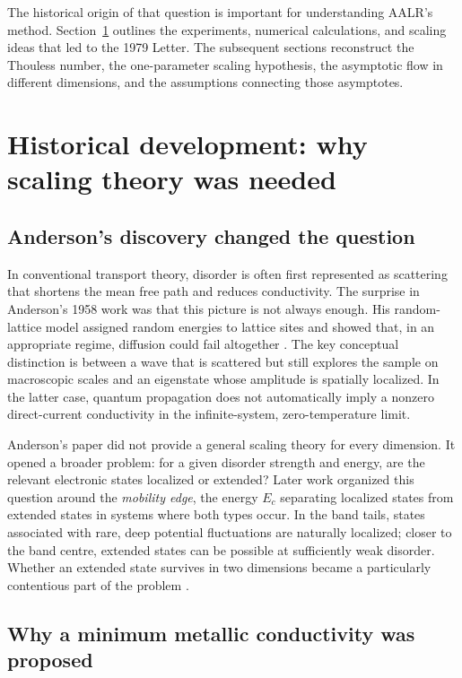 \documentclass[11pt,a4paper]{article}
\numberwithin{equation}{section}
\begin{document}
The historical origin of that question is important for understanding
AALR's method. Section~\ref{sec:historical-background} outlines the
experiments, numerical calculations, and scaling ideas that led to the
1979 Letter. The subsequent sections reconstruct the Thouless number,
the one-parameter scaling hypothesis, the asymptotic flow in different
dimensions, and the assumptions connecting those asymptotes.

\section{Historical development: why scaling theory was needed}
\label{sec:historical-background}

\subsection{Anderson's discovery changed the question}

In conventional transport theory, disorder is often first represented as
scattering that shortens the mean free path and reduces conductivity. The
surprise in Anderson's 1958 work was that this picture is not always enough.
His random-lattice model assigned random energies to lattice sites and
showed that, in an appropriate regime, diffusion could fail altogether
\cite{Anderson1958}. The key conceptual distinction is between a wave that
is scattered but still explores the sample on macroscopic scales and an
eigenstate whose amplitude is spatially localized. In the latter case,
quantum propagation does not automatically imply a nonzero direct-current
conductivity in the infinite-system, zero-temperature limit.

Anderson's paper did not provide a general scaling theory for every
dimension. It opened a broader problem: for a given disorder strength and
energy, are the relevant electronic states localized or extended? Later
work organized this question around the \emph{mobility edge}, the energy
$E_c$ separating localized states from extended states in systems where
both types occur. In the band tails, states associated with rare, deep
potential fluctuations are naturally localized; closer to the band centre,
extended states can be possible at sufficiently weak disorder. Whether an
extended state survives in two dimensions became a particularly contentious
part of the problem \cite{Thouless1974,LeeRamakrishnan1985,Nagaoka1985}.

\subsection{Why a minimum metallic conductivity was proposed}
\end{document}
